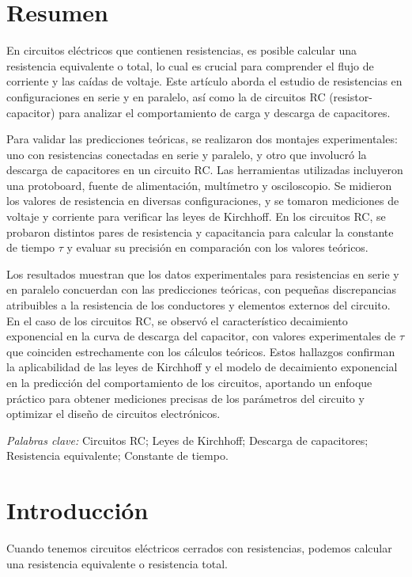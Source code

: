 \documentclass[article,12pt]{elsarticle}
\begin{document}
\section*{Resumen}
En circuitos eléctricos que contienen resistencias, es posible calcular una resistencia equivalente o total, lo cual es crucial para comprender el flujo de corriente y las caídas de voltaje. Este artículo aborda el estudio de resistencias en configuraciones en serie y en paralelo, así como la de circuitos RC (resistor-capacitor) para analizar el comportamiento de carga y descarga de capacitores.

Para validar las predicciones teóricas, se realizaron dos montajes experimentales: uno con resistencias conectadas en serie y paralelo, y otro que involucró la descarga de capacitores en un circuito RC. Las herramientas utilizadas incluyeron una protoboard, fuente de alimentación, multímetro y osciloscopio. Se midieron los valores de resistencia en diversas configuraciones, y se tomaron mediciones de voltaje y corriente para verificar las leyes de Kirchhoff. En los circuitos RC, se probaron distintos pares de resistencia y capacitancia para calcular la constante de tiempo \( \tau \) y evaluar su precisión en comparación con los valores teóricos.

Los resultados muestran que los datos experimentales para resistencias en serie y en paralelo concuerdan con las predicciones teóricas, con pequeñas discrepancias atribuibles a la resistencia de los conductores y elementos externos del circuito. En el caso de los circuitos RC, se observó el característico decaimiento exponencial en la curva de descarga del capacitor, con valores experimentales de \( \tau \) que coinciden estrechamente con los cálculos teóricos. Estos hallazgos confirman la aplicabilidad de las leyes de Kirchhoff y el modelo de decaimiento exponencial en la predicción del comportamiento de los circuitos, aportando un enfoque práctico para obtener mediciones precisas de los parámetros del circuito y optimizar el diseño de circuitos electrónicos.


\noindent \textit{Palabras clave:}  Circuitos RC; Leyes de Kirchhoff; Descarga de capacitores; Resistencia equivalente; Constante de tiempo.

\section{Introducción}
Cuando tenemos circuitos eléctricos cerrados con resistencias, podemos calcular una resistencia equivalente o resistencia total.
\end{document}
